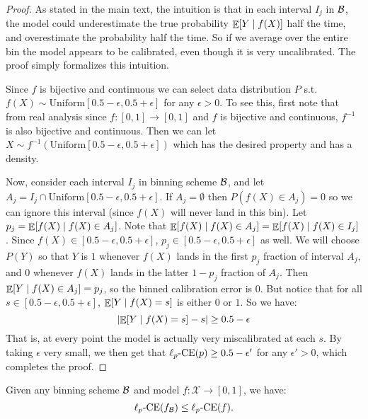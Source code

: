 \begin{proof}
As stated in the main text, the intuition is that in each interval $I_j$ in $\mathcal{B}{}$, the model could underestimate the true probability $\mathop{\mathbb{E}}[Y \mid f(X)]$ half the time, and overestimate the probability half the time. So if we average over the entire bin the model appears to be calibrated, even though it is very uncalibrated. The proof simply formalizes this intuition.

Since $f$ is bijective and continuous we can select data distribution $P$ s.t. $f(X) \sim \mbox{Uniform}[0.5 - \epsilon, 0.5 + \epsilon]$ for any $\epsilon > 0$. To see this, first note that from real analysis since $f : [0, 1] \to [0, 1]$ and $f$ is bijective and continuous, $f^{-1}$ is also bijective and continuous.
Then we can let $X \sim f^{-1}(\mbox{Uniform}[0.5 - \epsilon, 0.5 + \epsilon])$ which has the desired property and has a density.

Now, consider each interval $I_j$ in binning scheme $\mathcal{B}{}$, and let $A_j = I_j \cap \mbox{Uniform}[0.5 - \epsilon, 0.5 + \epsilon]$.
If $A_j = \emptyset$ then $P(f(X) \in A_j) = 0$ so we can ignore this interval (since $f(X)$ will never land in this bin).
Let $p_j = \mathop{\mathbb{E}}[f(X) \mid f(X) \in A_j]$.
Note that $\mathop{\mathbb{E}}[f(X) \mid f(X) \in A_j] = \mathop{\mathbb{E}}[f(X) \mid f(X) \in I_j]$.
Since $f(X) \in [0.5 - \epsilon, 0.5 + \epsilon]$, $p_j \in [0.5 - \epsilon, 0.5 + \epsilon]$ as well.
We will choose $P(Y)$ so that $Y$ is $1$ whenever $f(X)$ lands in the first $p_j$ fraction of interval $A_j$, and $0$ whenever $f(X)$ lands in the latter $1 - p_j$ fraction of $A_j$.
Then $\mathop{\mathbb{E}}[Y \mid f(X) \in A_j] = p_j$, so the binned calibration error is 0.
But notice that for all $s \in [0.5 - \epsilon, 0.5 + \epsilon]$, $\mathop{\mathbb{E}}[Y \mid f(X) = s]$ is either $0$ or $1$.
So we have:
\[ \lvert \mathop{\mathbb{E}}[Y \mid f(X) = s] - s \rvert \geq 0.5 - \epsilon \]
That is, at every point the model is actually very miscalibrated at each $s$. By taking $\epsilon$ very small, we then get that $\ell_p\textup{-CE}(p) \geq 0.5 - \epsilon'$ for any $\epsilon' > 0$, which completes the proof.
\end{proof}


\begin{binningLowerBound}
Given any binning scheme $\mathcal{B}{}$ and model $f : \mathcal{X} \to [0, 1]$, we have:
\[  \ell_p\textup{-CE}(f_{\mathcal{B}{}}) \leq \ell_p\textup{-CE}(f). \]
\end{binningLowerBound}

